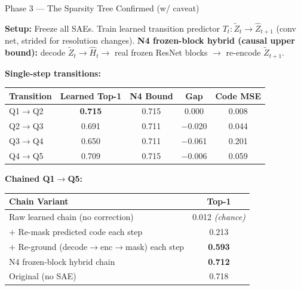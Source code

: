 \documentclass[final]{beamer}
\newlength{\colwidth}
\begin{document}
\begin{frame}[t]
\begin{columns}[t]
\begin{column}{\colwidth}
\begin{block}{Phase 3 --- The Sparsity Tree \textcolor{AccentGreen}{Confirmed (w/ caveat)}}
\small

\textbf{Setup:} Freeze all SAEs.  Train learned transition predictor
$T_t : \tilde{Z}_t \to \hat{Z}_{t+1}$ (conv net, strided for resolution changes).
\textbf{N4 frozen-block hybrid (causal upper bound):}
decode $\tilde{Z}_t \to \hat{H}_t \to$ real frozen ResNet blocks $\to$ re-encode $\tilde{Z}_{t+1}$.

\vspace{0.4em}
\textbf{Single-step transitions:}
\begin{center}
\begin{tabular}{@{}lcccc@{}}
\toprule
\textbf{Transition} & \textbf{Learned Top-1} & \textbf{N4 Bound} & \textbf{Gap} & \textbf{Code MSE} \\
\midrule
Q1$\to$Q2 & \textbf{0.715} & 0.715 & \textcolor{AccentGreen}{0.000} & 0.008 \\
Q2$\to$Q3 & 0.691 & 0.711 & $-$0.020 & 0.044 \\
Q3$\to$Q4 & 0.650 & 0.711 & \textcolor{AccentRed}{$-$0.061} & 0.201 \\
Q4$\to$Q5 & 0.709 & 0.715 & $-$0.006 & 0.059 \\
\bottomrule
\end{tabular}
\end{center}

\vspace{0.3em}
\textbf{Chained Q1$\to$Q5:}
\begin{center}
\begin{tabular}{@{}lc@{}}
\toprule
\textbf{Chain Variant} & \textbf{Top-1} \\
\midrule
\rowcolor{LightRed}
Raw learned chain (no correction) & 0.012 \textit{(chance)} \\
$+$ Re-mask predicted code each step & 0.213 \\
\rowcolor{LightGreen}
$+$ Re-ground (decode$\to$enc$\to$mask) each step & \textbf{0.593} \\
\rowcolor{LightBlue}
N4 frozen-block hybrid chain & \textbf{0.712} \\
Original (no SAE) & 0.718 \\
\bottomrule
\end{tabular}
\end{center}


\end{block}
\end{column}
\end{columns}
\end{frame}
\end{document}
